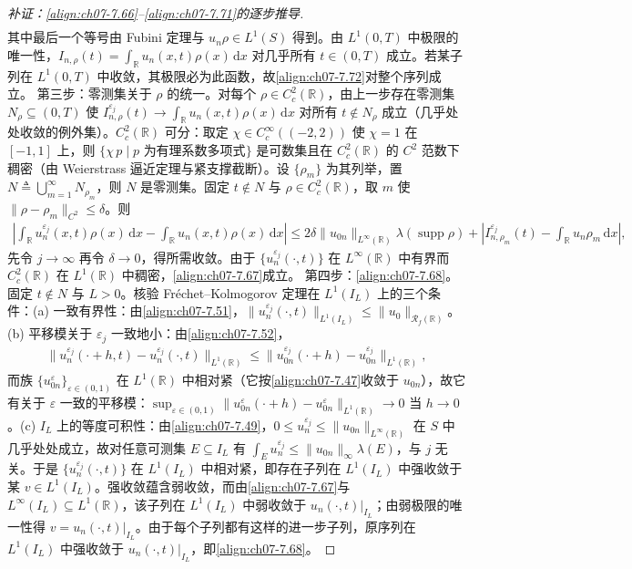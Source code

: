 ﻿\documentclass[../../main.tex]{subfiles}%
\begin{document}
\begin{proof}[补证：\eqref{align:ch07-7.66}--\eqref{align:ch07-7.71}的逐步推导]
\begin{align*}
\end{align*}
其中最后一个等号由 Fubini 定理与 $u_n\rho\in L^1(S)$ 得到。由 $L^1(0,T)$ 中极限的唯一性，$I_{n,\rho}(t)=\int_{\mathbb{R}}u_n(x,t)\rho(x)\,\mathrm{d}x$ 对几乎所有 $t\in(0,T)$ 成立。若某子列在 $L^1(0,T)$ 中收敛，其极限必为此函数，故\eqref{align:ch07-7.72}对整个序列成立。
第三步：零测集关于 $\rho$ 的统一。对每个 $\rho\in C^2_c(\mathbb{R})$，由上一步存在零测集 $N_\rho\subseteq(0,T)$ 使 $I_{n,\rho}^{\varepsilon_j}(t)\to\int_{\mathbb{R}}u_n(x,t)\rho(x)\,\mathrm{d}x$ 对所有 $t\notin N_\rho$ 成立（几乎处处收敛的例外集）。$C^2_c(\mathbb{R})$ 可分：取定 $\chi\in C^\infty_c((-2,2))$ 使 $\chi=1$ 在 $[-1,1]$ 上，则 $\{\chi\,p\mid p\text{ 为有理系数多项式}\}$ 是可数集且在 $C^2_c(\mathbb{R})$ 的 $C^2$ 范数下稠密（由 Weierstrass 逼近定理与紧支撑截断）。设 $\{\rho_m\}$ 为其列举，置 $N\triangleq\bigcup_{m=1}^\infty N_{\rho_m}$，则 $N$ 是零测集。固定 $t\notin N$ 与 $\rho\in C^2_c(\mathbb{R})$，取 $m$ 使 $\|\rho-\rho_m\|_{C^2}\leqslant\delta$。则
\begin{align*}
\left|\int_{\mathbb{R}}u_n^{\varepsilon_j}(x,t)\rho(x)\,\mathrm{d}x-\int_{\mathbb{R}}u_n(x,t)\rho(x)\,\mathrm{d}x\right|
\leqslant2\delta\|u_{0n}\|_{L^\infty(\mathbb{R})}\lambda(\operatorname{supp}\rho)
+\left|I_{n,\rho_m}^{\varepsilon_j}(t)-\int_{\mathbb{R}}u_n\rho_m\,\mathrm{d}x\right|,
\end{align*}
先令 $j\to\infty$ 再令 $\delta\to0$，得所需收敛。由于 $\{u_n^{\varepsilon_j}(\cdot,t)\}$ 在 $L^\infty(\mathbb{R})$ 中有界而 $C^2_c(\mathbb{R})$ 在 $L^1(\mathbb{R})$ 中稠密，\eqref{align:ch07-7.67}成立。
第四步：\eqref{align:ch07-7.68}。固定 $t\notin N$ 与 $L>0$。核验 Fréchet--Kolmogorov 定理在 $L^1(I_L)$ 上的三个条件：(a) 一致有界性：由\eqref{align:ch07-7.51}，$\|u_n^{\varepsilon_j}(\cdot,t)\|_{L^1(I_L)}\leqslant\|u_0\|_{\mathscr{R}_f(\mathbb{R})}$。(b) 平移模关于 $\varepsilon_j$ 一致地小：由\eqref{align:ch07-7.52}，
\begin{align*}
\|u_n^{\varepsilon_j}(\cdot+h,t)-u_n^{\varepsilon_j}(\cdot,t)\|_{L^1(\mathbb{R})}
\leqslant\|u_{0n}^{\varepsilon_j}(\cdot+h)-u_{0n}^{\varepsilon_j}\|_{L^1(\mathbb{R})},
\end{align*}
而族 $\{u_{0n}^\varepsilon\}_{\varepsilon\in(0,1)}$ 在 $L^1(\mathbb{R})$ 中相对紧（它按\eqref{align:ch07-7.47}收敛于 $u_{0n}$），故它有关于 $\varepsilon$ 一致的平移模：$\sup_{\varepsilon\in(0,1)}\|u_{0n}^\varepsilon(\cdot+h)-u_{0n}^\varepsilon\|_{L^1(\mathbb{R})}\to0$ 当 $h\to0$。(c) $I_L$ 上的等度可积性：由\eqref{align:ch07-7.49}，$0\leqslant u_n^{\varepsilon_j}\leqslant\|u_{0n}\|_{L^\infty(\mathbb{R})}$ 在 $S$ 中几乎处处成立，故对任意可测集 $E\subseteq I_L$ 有 $\int_Eu_n^{\varepsilon_j}\leqslant\|u_{0n}\|_\infty\lambda(E)$，与 $j$ 无关。于是 $\{u_n^{\varepsilon_j}(\cdot,t)\}$ 在 $L^1(I_L)$ 中相对紧，即存在子列在 $L^1(I_L)$ 中强收敛于某 $v\in L^1(I_L)$。强收敛蕴含弱收敛，而由\eqref{align:ch07-7.67}与 $L^\infty(I_L)\subseteq L^1(\mathbb{R})$，该子列在 $L^1(I_L)$ 中弱收敛于 $u_n(\cdot,t)|_{I_L}$；由弱极限的唯一性得 $v=u_n(\cdot,t)|_{I_L}$。由于每个子列都有这样的进一步子列，原序列在 $L^1(I_L)$ 中强收敛于 $u_n(\cdot,t)|_{I_L}$，即\eqref{align:ch07-7.68}。

\end{proof}
\end{document}
